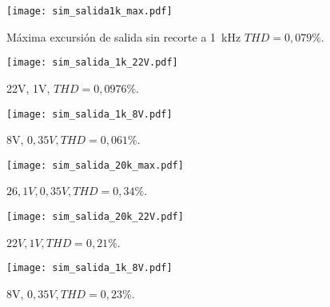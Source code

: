\begin{figure}[H]
	\centering
	\texttt{[image: sim\_salida1k\_max.pdf]}
	\caption{Máxima excursión de salida sin recorte a \SI{1}{\kilo\hertz} $THD = 0,079\%$.}
	\label{fig:sim_salida_1k_max}
	\end{figure}

\begin{figure}[H]
	\centering
	\texttt{[image: sim\_salida\_1k\_22V.pdf]}
	\caption{22V, 1V, $THD=0,0976\%$.}
	\end{figure}

\begin{figure}[H]
	\centering
	\texttt{[image: sim\_salida\_1k\_8V.pdf]}
	\caption{8V, $0,35V, THD=0,061\%$.}
\end{figure}

\begin{figure}[H]
	\centering
	\texttt{[image: sim\_salida\_20k\_max.pdf]}
	\caption{$26,1V, 0,35V, THD=0,34\%$.}
\end{figure}

\begin{figure}[H]
	\centering
	\texttt{[image: sim\_salida\_20k\_22V.pdf]}
	\caption{$22V, 1V, THD=0,21\%$.}
\end{figure}

\begin{figure}[H]
	\centering
	\texttt{[image: sim\_salida\_1k\_8V.pdf]}
	\caption{8V, $0,35V, THD=0,23\%$.}
\end{figure}




